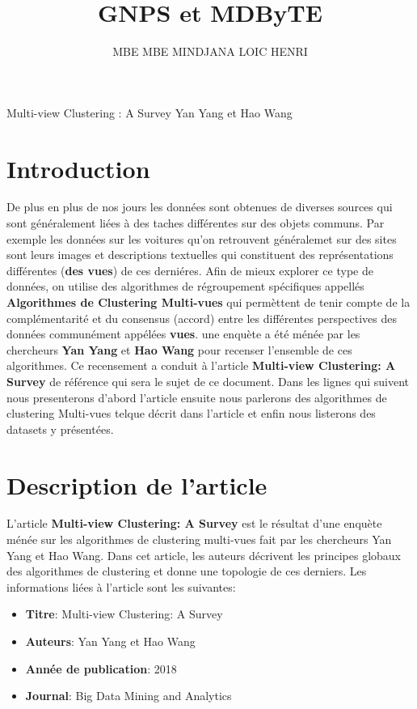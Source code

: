 \documentclass[12pt, french, latin.medieval, a4paper]{report}
\author{MBE MBE MINDJANA LOIC HENRI}
\title{GNPS et MDByTE}
\begin{document}
    
    \pagecouverture
    {Multi-view Clustering : A Survey}
    {Yan Yang et Hao Wang}
    \tableofcontents
    \vspace{20cm}
    
    \section{Introduction}
    De plus en plus de nos jours les données sont obtenues de diverses sources qui sont généralement liées à des taches différentes sur des objets communs. Par exemple les données sur les voitures qu'on retrouvent généralemet sur des sites sont leurs images et descriptions textuelles qui constituent des représentations différentes (\textbf{des vues}) de ces derniéres. Afin de mieux explorer ce type de données, on utilise des algorithmes de régroupement spécifiques appellés \textbf{Algorithmes de Clustering Multi-vues} qui permèttent de tenir compte de la complémentarité et du consensus (accord) entre les différentes perspectives des données communément appélées \textbf{vues}. une enquète a été ménée par les chercheurs \textbf{Yan Yang} et \textbf{Hao Wang} pour recenser l'ensemble de ces algorithmes. Ce recensement a conduit à l'article \textbf{Multi-view Clustering: A Survey} de référence \cite{yang2018multi} qui sera le sujet de ce document. Dans les lignes qui suivent nous presenterons d'abord l'article ensuite nous parlerons des algorithmes de clustering Multi-vues telque décrit dans l'article et enfin nous listerons des datasets y présentées.
    
    \section{Description de l'article}
    L'article \textbf{Multi-view Clustering: A Survey} \cite{yang2018multi} est le résultat d'une enquète ménée sur les algorithmes de clustering multi-vues fait par les chercheurs Yan Yang et Hao Wang. Dans cet article, les auteurs décrivent les principes globaux des algorithmes de clustering et donne une topologie de ces derniers. Les informations liées à l'article sont les suivantes:
    \begin{itemize}
        \item \textbf{Titre}: Multi-view Clustering: A Survey
        \item \textbf{Auteurs}: Yan Yang et Hao Wang
        \item \textbf{Année de publication}: 2018
        \item \textbf{Journal}: Big Data Mining and Analytics
    \end{itemize}
    
\end{document}
